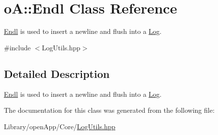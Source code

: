 \hypertarget{classo_a_1_1_endl}{}\section{oA\+:\+:Endl Class Reference}
\label{classo_a_1_1_endl}


\mbox{\hyperlink{classo_a_1_1_endl}{Endl}} is used to insert a newline and flush into a \mbox{\hyperlink{classo_a_1_1_log}{Log}}.  




{\ttfamily \#include $<$Log\+Utils.\+hpp$>$}



\subsection{Detailed Description}
\mbox{\hyperlink{classo_a_1_1_endl}{Endl}} is used to insert a newline and flush into a \mbox{\hyperlink{classo_a_1_1_log}{Log}}. 

The documentation for this class was generated from the following file\+:\begin{DoxyCompactItemize}
\item 
Library/open\+App/\+Core/\mbox{\hyperlink{_log_utils_8hpp}{Log\+Utils.\+hpp}}\end{DoxyCompactItemize}
